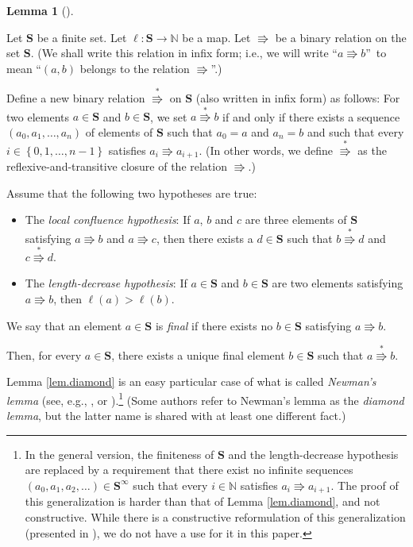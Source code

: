 \documentclass[numbers=enddot,12pt,final,onecolumn,notitlepage]{scrartcl}%
\theoremstyle{definition}
\newtheorem{lem}[theo]{Lemma}
\newenvironment{lemma}[1][]
{\begin{lem}[#1]\begin{leftbar}}
{\end{leftbar}\end{lem}}
\begin{document}
\begin{lemma}
\label{lem.diamond}Let $\mathbf{S}$ be a finite set. Let $\ell:\mathbf{S}%
\rightarrow\mathbb{N}$ be a map. Let $\Rrightarrow$ be a binary relation on
the set $\mathbf{S}$. (We shall write this relation in infix form; i.e., we
will write \textquotedblleft$a\Rrightarrow b$\textquotedblright\ to mean
\textquotedblleft$\left(  a,b\right)  $ belongs to the relation $\Rrightarrow
$\textquotedblright.)

Define a new binary relation $\overset{\ast}{\Rrightarrow}$ on $\mathbf{S}$
(also written in infix form) as follows: For two elements $a\in\mathbf{S}$ and
$b\in\mathbf{S}$, we set $a\overset{\ast}{\Rrightarrow}b$ if and only if there
exists a sequence $\left(  a_{0},a_{1},\ldots,a_{n}\right)  $ of elements of
$\mathbf{S}$ such that $a_{0}=a$ and $a_{n}=b$ and such that every
$i\in\left\{  0,1,\ldots,n-1\right\}  $ satisfies $a_{i}\Rrightarrow a_{i+1}$.
(In other words, we define $\overset{\ast}{\Rrightarrow}$ as the
reflexive-and-transitive closure of the relation $\Rrightarrow$.)

Assume that the following two hypotheses are true:

\begin{itemize}
\item The \textit{local confluence hypothesis}: If $a$, $b$ and $c$ are three
elements of $\mathbf{S}$ satisfying $a\Rrightarrow b$ and $a\Rrightarrow c$,
then there exists a $d\in\mathbf{S}$ such that $b\overset{\ast}{\Rrightarrow
}d$ and $c\overset{\ast}{\Rrightarrow}d$.

\item The \textit{length-decrease hypothesis}: If $a\in\mathbf{S}$ and
$b\in\mathbf{S}$ are two elements satisfying $a\Rrightarrow b$, then
$\ell\left(  a\right)  >\ell\left(  b\right)  $.
\end{itemize}

We say that an element $a\in\mathbf{S}$ is \textit{final} if there exists no
$b\in\mathbf{S}$ satisfying $a\Rrightarrow b$.

Then, for every $a\in\mathbf{S}$, there exists a unique final element
$b\in\mathbf{S}$ such that $a\overset{\ast}{\Rrightarrow}b$.
\end{lemma}

Lemma \ref{lem.diamond} is an easy particular case of what is called
\textit{Newman's lemma} (see, e.g., \cite{BezCoq}, or \cite[Lemma 2.7.2 + Fact
2.1.7]{BaaNip98}).\footnote{In the general version, the finiteness of
$\mathbf{S}$ and the length-decrease hypothesis are replaced by a requirement
that there exist no infinite sequences $\left(  a_{0},a_{1},a_{2}%
,\ldots\right)  \in\mathbf{S}^{\infty}$ such that every $i\in\mathbb{N}$
satisfies $a_{i}\Rrightarrow a_{i+1}$. The proof of this generalization is
harder than that of Lemma \ref{lem.diamond}, and not constructive. While there
is a constructive reformulation of this generalization (presented in
\cite[Lemma 3.3]{BezCoq}), we do not have a use for it in this paper.} (Some
authors refer to Newman's lemma as the \textit{diamond lemma}, but the latter
name is shared with at least one different fact.)
\end{document}
